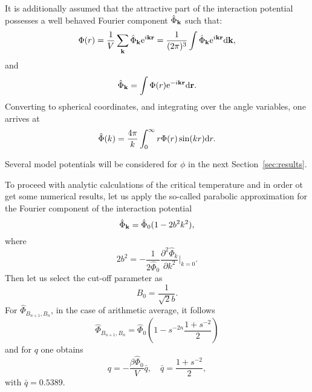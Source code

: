 It is additionally assumed that the attractive part of the interaction potential possesses a well behaved Fourier component $\hat{\Phi}_{\vb k}$ such that:
\begin{equation*}
	\Phi(r) = \frac{1}{V} \sum_{\vb k} \hat{\Phi}_{\vb k} {\rm e}^{i\vb k \vb r} = \frac{1}{(2\pi)^3} \int \hat{\Phi}_{\vb k} {\rm e}^{i\vb k \vb r} {\rm d} {\vb k},
\end{equation*}
and
\begin{equation*}
	\label{def:fourier}
	\hat{\Phi}_{\vb k} = \int \Phi(r) {\rm e}^{-i\vb k \vb r} {\rm d} {\vb r}.
\end{equation*}
Converting to spherical coordinates, and integrating over the angle variables, one arrives at
\begin{equation}
	\label{def:fourier_spherical}
	\hat{\Phi}(k) = \frac{4\pi}{k} \int_{0}^{\infty} r \Phi(r) \sin(k r) {\rm d} r.
\end{equation}

Several model potentials will be considered for $\phi$ in the next Section~\ref{sec:results}. 

To proceed with analytic calculations of the critical temperature and in order ot get some numerical results, let us apply the so-called parabolic approximation for the Fourier component of the interaction potential
\begin{equation*}
	\hat{\Phi}_{\vb k} = \hat{\Phi}_0 (1 - 2b^2k^2),
\end{equation*}
where 
\begin{equation*}
	2b^2 = -\frac{1}{2\hat{\Phi}_0} \frac{\partial^2 \hat{\Phi}_k}{\partial k^2} \bigg|_{k=0}.
\end{equation*}
Then let us select the cut-off parameter as
\begin{equation*}
B_0 = \frac{1}{\sqrt{2} b}.
\end{equation*}
For $\hat{\Phi}_{B_{n+1}, B_n}$, in the case of arithmetic average, it follows
\begin{equation*}
	\hat{\Phi}_{B_{n+1}, B_n} = \hat{\Phi}_0 \left(1 - s^{-2n} \frac{1 + s^{-2}}{2}\right)
\end{equation*}
and for $q$ one obtains
\begin{equation*}
	q = -\frac{\beta \hat{\Phi}_0}{V} \bar{q}, \quad \bar{q} = \frac{1 + s^{-2}}{2},
\end{equation*}
with $\bar{q} = 0.5389$.

